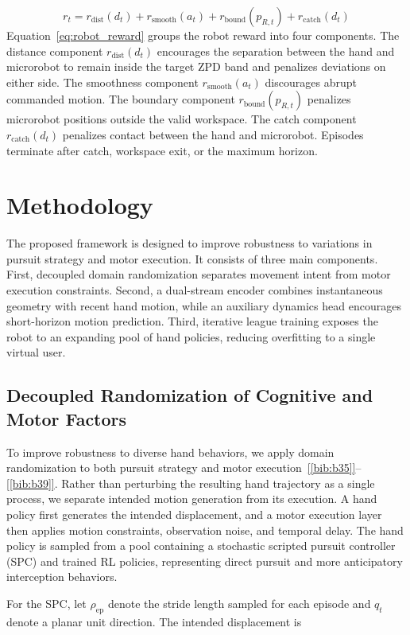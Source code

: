 \documentclass[journal,twoside,web]{ieeecolor2}
\newcommand{\citelink}[1]{\hyperref[bib:#1]{[\ref*{bib:#1}]}}
\newcommand{\citerange}[2]{\citelink{#1}--\citelink{#2}}
\begin{document}
\begin{equation}
r_t = r_{\mathrm{dist}}(d_t) + r_{\mathrm{smooth}}(a_t) + r_{\mathrm{bound}}(p_{R,t}) + r_{\mathrm{catch}}(d_t)
\label{eq:robot_reward}
\end{equation}
Equation~\eqref{eq:robot_reward} groups the robot reward into four components. The distance component $r_{\mathrm{dist}}(d_t)$ encourages the separation between the hand and microrobot to remain inside the target ZPD band and penalizes deviations on either side. The smoothness component $r_{\mathrm{smooth}}(a_t)$ discourages abrupt commanded motion. The boundary component $r_{\mathrm{bound}}(p_{R,t})$ penalizes microrobot positions outside the valid workspace. The catch component $r_{\mathrm{catch}}(d_t)$ penalizes contact between the hand and microrobot. Episodes terminate after catch, workspace exit, or the maximum horizon.

\section{Methodology}
The proposed framework is designed to improve robustness to variations in pursuit strategy and motor execution. It consists of three main components. First, decoupled domain randomization separates movement intent from motor execution constraints. Second, a dual-stream encoder combines instantaneous geometry with recent hand motion, while an auxiliary dynamics head encourages short-horizon motion prediction. Third, iterative league training exposes the robot to an expanding pool of hand policies, reducing overfitting to a single virtual user.

\subsection{Decoupled Randomization of Cognitive and Motor Factors}
To improve robustness to diverse hand behaviors, we apply domain randomization to both pursuit strategy and motor execution~\citerange{b35}{b39}. Rather than perturbing the resulting hand trajectory as a single process, we separate intended motion generation from its execution. A hand policy first generates the intended displacement, and a motor execution layer then applies motion constraints, observation noise, and temporal delay. The hand policy is sampled from a pool containing a stochastic scripted pursuit controller (SPC) and trained RL policies, representing direct pursuit and more anticipatory interception behaviors.

For the SPC, let $\rho_{\mathrm{ep}}$ denote the stride length sampled for each episode and $q_t$ denote a planar unit direction. The intended displacement is
\end{document}
